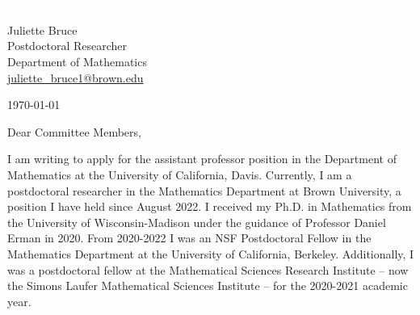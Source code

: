 \documentclass[11pt]{article}
\begin{document}
\section*{}

\noindent
\begin{minipage}{0.99\textwidth}
\begin{minipage}{0.69\textwidth}
\textcolor{white}{.}
\end{minipage}
\begin{minipage}{0.29\textwidth}
{
Juliette Bruce \\
Postdoctoral Researcher \\
Department of Mathematics \\
\href{mailto:juliette\_bruce1@brown.edu}{juliette\_bruce1@brown.edu}
}

\vspace{12pt}
\today
\end{minipage}
\end{minipage}


\vspace{12pt}
\noindent
Dear Committee Members,

I am writing to apply for the assistant professor position in the Department of Mathematics at the University of California, Davis. Currently, I am a postdoctoral researcher in the Mathematics Department at Brown University, a position I have held since August 2022. I received my Ph.D. in Mathematics from the University of Wisconsin-Madison under the guidance of Professor Daniel Erman in 2020. From 2020-2022 I was an NSF Postdoctoral Fellow in the Mathematics Department at the University of California, Berkeley. Additionally, I was a postdoctoral fellow at the Mathematical Sciences Research Institute -- now the Simons Laufer Mathematical Sciences Institute -- for the 2020-2021 academic year.
\end{document}
